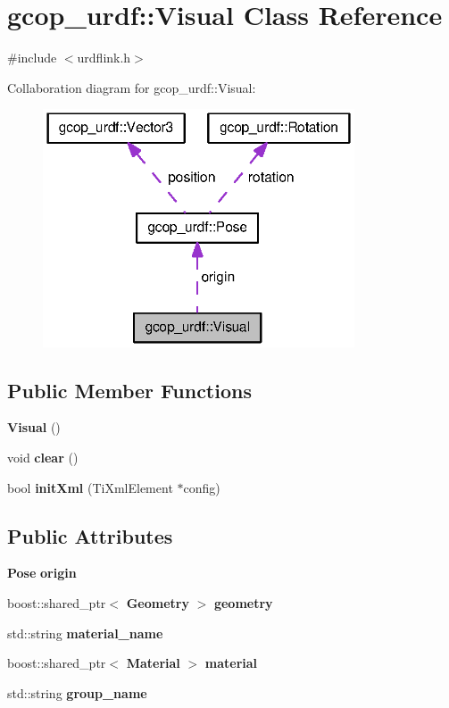 \section{gcop\-\_\-urdf\-:\-:\-Visual \-Class \-Reference}
\label{classgcop__urdf_1_1Visual}


{\ttfamily \#include $<$urdflink.\-h$>$}



\-Collaboration diagram for gcop\-\_\-urdf\-:\-:\-Visual\-:
\nopagebreak
\begin{figure}[H]
\begin{center}
\leavevmode
\includegraphics[width=262pt]{classgcop__urdf_1_1Visual__coll__graph}
\end{center}
\end{figure}
\subsection*{\-Public \-Member \-Functions}
\begin{DoxyCompactItemize}
\item 
{\bf \-Visual} ()
\item 
void {\bf clear} ()
\item 
bool {\bf init\-Xml} (\-Ti\-Xml\-Element $\ast$config)
\end{DoxyCompactItemize}
\subsection*{\-Public \-Attributes}
\begin{DoxyCompactItemize}
\item 
{\bf \-Pose} {\bf origin}
\item 
boost\-::shared\-\_\-ptr$<$ {\bf \-Geometry} $>$ {\bf geometry}
\item 
std\-::string {\bf material\-\_\-name}
\item 
boost\-::shared\-\_\-ptr$<$ {\bf \-Material} $>$ {\bf material}
\item 
std\-::string {\bf group\-\_\-name}
\end{DoxyCompactItemize}


